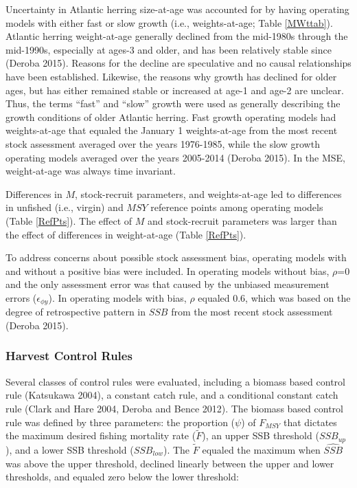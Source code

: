 \documentclass[]{article}
\begin{document}
Uncertainty in Atlantic herring size-at-age was accounted for by having
operating models with either fast or slow growth (i.e., weights-at-age;
Table \ref{MWttab}). Atlantic herring weight-at-age generally declined
from the mid-1980s through the mid-1990s, especially at ages-3 and
older, and has been relatively stable since (Deroba 2015). Reasons for
the decline are speculative and no causal relationships have been
established. Likewise, the reasons why growth has declined for older
ages, but has either remained stable or increased at age-1 and age-2 are
unclear. Thus, the terms ``fast'' and ``slow'' growth were used as
generally describing the growth conditions of older Atlantic herring.
Fast growth operating models had weights-at-age that equaled the January
1 weights-at-age from the most recent stock assessment averaged over the
years 1976-1985, while the slow growth operating models averaged over
the years 2005-2014 (Deroba 2015). In the MSE, weight-at-age was always
time invariant.

Differences in \(M\), stock-recruit parameters, and weights-at-age led
to differences in unfished (i.e., virgin) and \(MSY\) reference points
among operating models (Table \ref{RefPts}). The effect of \(M\) and
stock-recruit parameters was larger than the effect of differences in
weight-at-age (Table \ref{RefPts}).

To address concerns about possible stock assessment bias, operating
models with and without a positive bias were included. In operating
models without bias, \(\rho\)=0 and the only assessment error was that
caused by the unbiased measurement errors (\(\epsilon_{\phi y}\)). In
operating models with bias, \(\rho\) equaled 0.6, which was based on the
degree of retrospective pattern in \(SSB\) from the most recent stock
assessment (Deroba 2015).

\subsubsection{Harvest Control Rules}\label{harvest-control-rules}

Several classes of control rules were evaluated, including a biomass
based control rule (Katsukawa 2004), a constant catch rule, and a
conditional constant catch rule (Clark and Hare 2004, Deroba and Bence
2012). The biomass based control rule was defined by three parameters:
the proportion (\(\psi\)) of \(F_{MSY}\) that dictates the maximum
desired fishing mortality rate (\(\tilde{F}\)), an upper SSB threshold
(\(SSB_{up}\)), and a lower SSB threshold (\(SSB_{low}\)). The
\(\tilde{F}\) equaled the maximum when \(\widehat{SSB}\) was above the
upper threshold, declined linearly between the upper and lower
thresholds, and equaled zero below the lower threshold:
\end{document}
